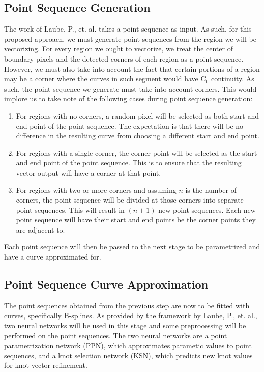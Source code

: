 \subsection{Point Sequence Generation}
The work of Laube, P., et. al. takes a point sequence as input. As such, for this proposed approach, we must generate point sequences from the region we will be vectorizing. For every region we ought to vectorize, we treat the center of boundary pixels and the detected corners of each region as a point sequence. However, we must also take into account the fact that certain portions of a region may be a corner where the curves in such segment would have C$_{0}$ continuity. As such, the point sequence we generate must take into account corners. This would implore us to take note of the following cases during point sequence generation:

\begin{enumerate}
	\item For regions with no corners, a random pixel will be selected as both start and end point of the point sequence. The expectation is that there will be no difference in the resulting curve from choosing a different start and end point.
	
	\item For regions with a single corner, the corner point will be selected as the start and end point of the point sequence. This is to ensure that the resulting vector output will have a corner at that point.
	
	\item For regions with two or more corners and assuming $n$ is the number of corners, the point sequence will be divided at those corners into separate point sequences. This will result in $(n + 1)$ new point sequences. Each new point sequence will have their start and end points be the corner points they are adjacent to.
\end{enumerate}

Each point sequence will then be passed to the next stage to be parametrized and have a curve approximated for.

\subsection{Point Sequence Curve Approximation}
The point sequences obtained from the previous step are now to be fitted with curves, specifically B-splines. As provided by the framework by Laube, P., et. al., two neural networks will be used in this stage and some preprocessing will be performed on the point sequences. The two neural networks are a point parametrization network (PPN), which approximates parametic values to point sequences, and a knot selection network (KSN), which predicts new knot values for knot vector refinement.

